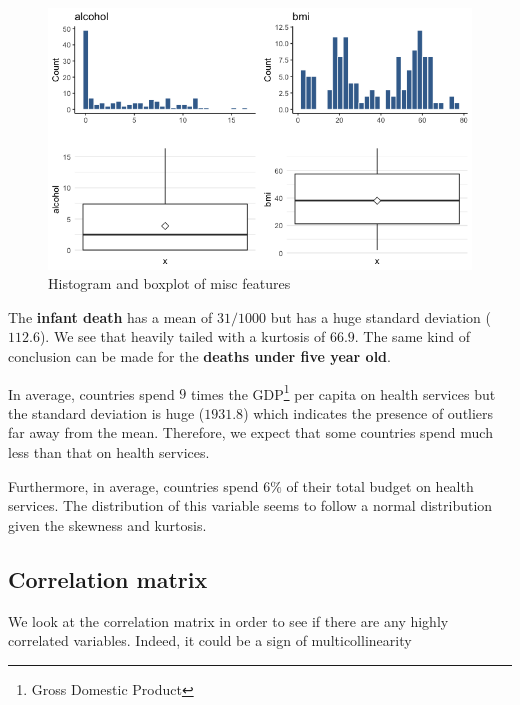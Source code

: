 
\begin{figure}[H]
	\centering
	\includegraphics{figures/eda/histogram_boxplot_misc_features.png}
	\caption{Histogram and boxplot of misc features}
	\label{fig:histogram_boxplot_misc_features}
\end{figure}


The \textbf{infant death} has a mean of $31 / 1000$ but has a huge standard deviation ($112.6$). We see that heavily tailed with a kurtosis of $66.9$. The same kind of conclusion can be made for the \textbf{deaths under five year old}.

In average, countries spend $9$ times the GDP\footnote{Gross Domestic Product} per capita on health services but the standard deviation is huge ($1931.8$) which indicates the presence of outliers far away from the mean. Therefore, we expect that some countries spend much less than that on health services.

Furthermore, in average, countries spend $6 \%$ of their total budget on health services. The distribution of this variable seems to follow a normal distribution given the skewness and kurtosis.

\subsection{Correlation matrix}

We look at the correlation matrix in order to see if there are any highly correlated variables. Indeed, it could be a sign of multicollinearity

